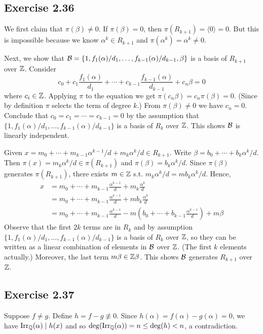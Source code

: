 \documentclass[../Marcus.tex]{subfiles}
\begin{document}
\subsection*{Exercise 2.36}

We first claim that $\pi(\beta)\neq 0$. If $\pi(\beta)=0$, then $\pi(R_{k+1})=\langle0\rangle=0$. But this is impossible because we know $\alpha^k\in R_{k+1}$ and $\pi(\alpha^k)=\alpha^k\neq0$.

Next, we show that $\mathcal{B}=\{1,f_1(\alpha)/d_1,\ldots,f_{k-1}(\alpha)/d_{k-1},\beta\}$ is a basis of $R_{k+1}$ over $\mathbb{Z}$. Consider $$c_0+c_1\frac{f_1(\alpha)}{d_1}+\cdots+c_{k-1}\frac{f_{k-1}(\alpha)}{d_{k-1}}+c_n\beta=0$$ where $c_i\in\mathbb{Z}$. Applying $\pi$ to the equation we get $\pi(c_n\beta)=c_n\pi(\beta)=0$. (Since by definition $\pi$ selects the term of degree $k$.) From $\pi(\beta)\neq 0$ we have $c_n=0$. Conclude that $c_0=c_1=\cdots=c_{k-1}=0$ by the assumption that $\{1,f_1(\alpha)/d_1,\ldots,f_{k-1}(\alpha)/d_{k-1}\}$ is a basis of $R_k$ over $\mathbb{Z}$. This shows $\mathcal{B}$ is linearly independent.

Given $x=m_0+\cdots+m_{k-1}\alpha^{k-1}/d+m_k\alpha^k/d \in R_{k+1}$. Write $\beta=b_0+\cdots+b_k\alpha^k/d$. Then $\pi(x)=m_k\alpha^k/d \in \pi(R_{k+1})$ and $\pi(\beta)=b_k\alpha^k/d$. Since $\pi(\beta)$ generates $\pi(R_{k+1})$, there exists $m\in\mathbb{Z}$ s.t. $m_k\alpha^k/d=mb_k\alpha^k/d$. Hence,
\begin{align*}
    x &= m_0+\cdots+m_{k-1}\frac{\alpha^{k-1}}{d}+m_k\frac{\alpha^k}{d} \\
    &= m_0+\cdots+m_{k-1}\frac{\alpha^{k-1}}{d}+mb_k\frac{\alpha^k}{d} \\
    &= m_0+\cdots+m_{k-1}\frac{\alpha^{k-1}}{d}-m\left(b_0+\cdots+b_{k-1}\frac{\alpha^{k-1}}{d}\right)+m\beta
\end{align*}
Observe that the first $2k$ terms are in $R_{k}$ and by assumption $\{1,f_1(\alpha)/d_1,\ldots,f_{k-1}(\alpha)/d_{k-1}\}$ is a basis of $R_k$ over $\mathbb{Z}$, so they can be written as a linear combination of elements in $\mathcal{B}$ over $\mathbb{Z}$. (The first $k$ elements actually.) Moreover, the last term $m\beta\in\mathbb{Z}\beta$. This shows $\mathcal{B}$ generates $R_{k+1}$ over $\mathbb{Z}$.

\subsection*{Exercise 2.37}

Suppose $f\neq g$. Define $h=f-g\not\equiv0$. Since $h(\alpha)=f(\alpha)-g(\alpha)=0$, we have $\operatorname{Irr}_{\mathbb{Q}}(\alpha)\mid h(x)$ and so $\deg(\operatorname{Irr}_{\mathbb{Q}}(\alpha))=n\leq\deg(h)<n$, a contradiction.
\end{document}
